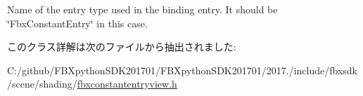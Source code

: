 Name of the entry type used in the binding entry. It should be \char`\"{}\+Fbx\+Constant\+Entry\char`\"{} in this case. 

このクラス詳解は次のファイルから抽出されました\+:\begin{DoxyCompactItemize}
\item 
C\+:/github/\+F\+B\+Xpython\+S\+D\+K201701/\+F\+B\+Xpython\+S\+D\+K201701/2017./include/fbxsdk/scene/shading/\hyperlink{fbxconstantentryview_8h}{fbxconstantentryview.\+h}\end{DoxyCompactItemize}
